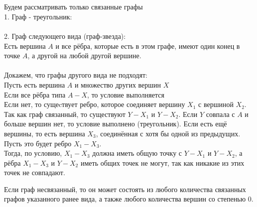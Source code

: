 \documentclass{article}
\begin{document}
\section{}
Будем рассматривать только связанные графы\\
1. Граф - треугольник:\\
\\
2. Граф следующего вида (граф-звезда):\\
Есть вершина $A$ и все рёбра, которые есть в этом графе, имеют один конец в точке $A$, а другой на любой другой вершине.\\
\\Докажем, что графы другого вида не подходят:
\\Пусть есть вершина $A$ и множество других вершин $X$\\
Если все рёбра типа $A-X$, то условие выполняется\\ Если нет, то сущеcтвует ребро, которое соединяет вершину $X_1$ с вершиной $X_2$.\\
Так как граф связанный, то существуют $Y-X_1$ и $Y-X_2$. Если $Y$ совпала с $A$ и больше вершин нет, то условие выполнено (треугольник). Если есть ещё вершины, то есть вершина $X_3$, соединённая с хотя бы одной из предыдущих. \\Пусть это будет ребро $X_1-X_3$.\\
Тогда, по условию, $X_1-X_3$ должна иметь общую точку с $Y-X_1$ и $Y-X_2$, а рёбра $X_1-X_3$ и $Y-X_2$ иметь общих точек не могут, так как никакие из этих точек не совпадают.


Если граф несвязанный, то он может состоять из любого количества связанных графов указанного ранее вида, а также любого количества вершин со степенью 0.
\end{document}

